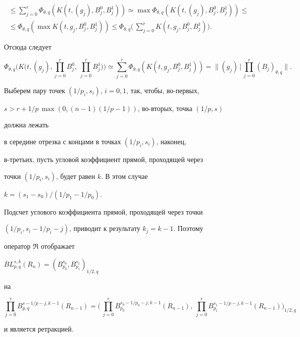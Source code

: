 \begin{pf}
\begin{multline*}
\le \sum^r_{j=0}\Phi_{\theta,q}(K(t,(g_j),B^0_j,B^1_j))\simeq 


\max\Phi_{\theta,q}(K(t,(g_j),B^0_j,B^1_j))\le \\ 


%


\le \Phi_{\theta,q}(\max K(t,g_j,B^0_j,B^1_j))\le \Phi_{\theta,q} 


\Big(\,\sum^r_{j=0}K(t,g_j,B^0_j,B^1_j)\Big). 


\end{multline*} 


Отсюда следует 


$$ 


\Phi_{\theta,q}\Big(K\Big(t,(g_j),\prod^r_{j=0}B^0_j,\  


\prod^r_{j=0}B^1_j\Big)\Big)\simeq\sum^r_{j=0} 


\Phi_{\theta,q}(K(t,g_j,B^0_j,B^1_j))= 


\Big\|(g_j)\,\Big|\,\prod^r_{j=0}(B_j)_{\theta,q}\Big\|. 


$$ 


 


Выберем пару точек $(1/p_i,s_i)$, $i=0,1$, так, чтобы, во-первых, 


$s>r+1/p\,\max(0,(n-1)(1/p-1))$, во-вторых, точка $(1/p,s)$ 


должна лежать 


в середине отрезка с концами в точках $(1/p_i,s_i)$, наконец, 


в-третьих, пусть угловой коэффициент прямой, проходящей через 


точки $(1/p_i,s_i)$, будет равен $k$. В этом случае 


$k=(s_1-s_0)/(1/p_1-1/p_0)$. 


Подсчет углового коэффициента прямой, проходящей через точки 


$(1/p_i,s_i-1/p_i-j)$, приводит к результату $k_j=k-1$. Поэтому 


оператор $\Re$ отображает 


$BL^{s,k}_{p,q}(R_n)= 


(B^{s_0}_{p_0},B^{s_1}_{p_1})_{1/2,q}$ 


на 


$$ 


\prod^r_{j=0}B^{s-1/p-j,k-1}_{p,q}(R_{n-1})= 


\Big(\,\prod^r_{j=0}B^{s_0-1/p_0-j,k-1}_{p_0}(R_{n-1}), 


\ \prod^r_{j=0}B^{s_1-1/p-j,k-1}_{p_1}(R_{n-1})\Big)_{1/2,q} 


$$ 


и является ретракцией. 


\end{pf} 


